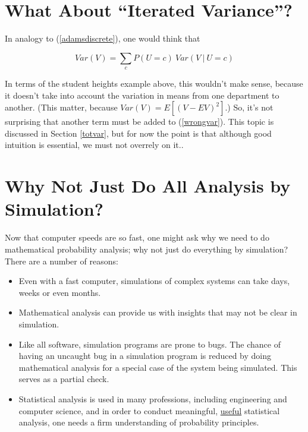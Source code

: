 \section{What About ``Iterated Variance''?}

In analogy to (\ref{adamsdiscrete}), one would think that

\begin{equation}
\label{wrongvar}
Var(V) = \sum_c P(U = c) ~ Var(V ~|~ U = c) 
\end{equation}

In terms of the student heights example above, this wouldn't make sense,
because it doesn't take into account the variation in means from one
department to another.  (This matter, because $Var(V) = E[(V - EV)^2]$.)
So, it's not surprising that another term must be added to
(\ref{wrongvar}).  This topic is discussed in Section \ref{totvar}, but
for now the point is that although good intuition is essential, we must
not overrely on it..

\section{Why Not Just Do All Analysis by Simulation?}

Now that computer speeds are so fast, one might ask why we need to do
mathematical probability analysis; why not just do everything by
simulation?  There are a number of reasons:

\begin{itemize}

\item Even with a fast computer, simulations of complex systems can take
days, weeks or even months.

\item Mathematical analysis can provide us with insights that may not
be clear in simulation.

\item Like all software, simulation programs are prone to bugs.  The
chance of having an uncaught bug in a simulation program is reduced by
doing mathematical analysis for a special case of the system being
simulated.  This serves as a partial check.

\item Statistical analysis is used in many professions, including
engineering and computer science, and in order to conduct meaningful,
\underline{useful} statistical analysis, one needs a firm understanding
of probability principles.

\end{itemize}

